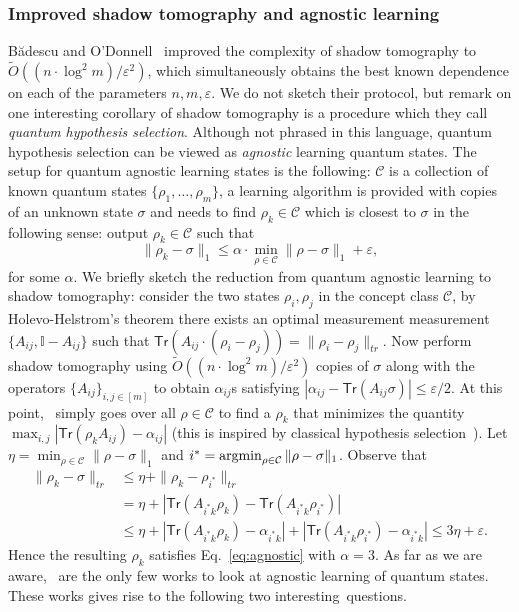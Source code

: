 \documentclass[11pt]{article}
\newcommand{\Cc}{\ensuremath{\mathcal{C}}}
\newcommand{\id}{\ensuremath{\mathbb{I}}}
\newcommand{\Tr}{\textsf{Tr}}
\begin{document}
\subsubsection{Improved shadow tomography and agnostic learning} 
 B{\u a}descu and O'Donnell~\cite{DBLP:conf/stoc/BadescuO21} improved the complexity of shadow tomography to $\tilde{O}((n\cdot \log^2 m)/\varepsilon^2)$, which simultaneously obtains the best known dependence on each of the parameters $n,m,\varepsilon$. We do not sketch their protocol, but remark on one interesting corollary of shadow tomography is a procedure which they call \emph{quantum hypothesis selection}. Although not phrased in this language, quantum hypothesis selection can be viewed as \emph{agnostic} learning quantum states. The setup for quantum agnostic learning states is the following: $\Cc$ is a collection of known quantum states $\{\rho_1,\ldots,\rho_m\}$, a learning algorithm is provided with copies of an unknown state $\sigma$ and needs to find $\rho_{k} \in \Cc$ which is closest to $\sigma$ in the following sense: output $\rho_{k}\in \Cc$ such that
 \begin{equation}
 \label{eq:agnostic}
 \|\rho_{k}-\sigma\|_1\leq \alpha \cdot \min_{\rho\in \Cc}  \|\rho-\sigma\|_1+\varepsilon,
 \end{equation}
 for some $\alpha$. We briefly sketch the reduction from quantum agnostic learning  to shadow tomography:  consider the two states $\rho_i,\rho_j$ in the concept class $\Cc$, by Holevo-Helstrom's theorem there exists an optimal measurement measurement $\{A_{ij},\id-A_{ij}\}$ such that $\Tr(A_{ij}\cdot (\rho_i-\rho_j))=\|\rho_i-\rho_j\|_{tr}$. Now perform shadow tomography using $\tilde{O}((n\cdot \log^2 m)/\varepsilon^2)$ copies of  $\sigma$ along with the operators $\{A_{ij}\}_{i,j\in [m]}$ to obtain $\alpha_{ij}$s satisfying  $|\alpha_{ij}-\Tr(A_{ij}\sigma)|\leq \varepsilon/2$. At this 
 point,~\cite{DBLP:conf/stoc/BadescuO21} simply goes over all $\rho \in \Cc$ to find a $\rho_{k}$ that minimizes the quantity $\max_{i,j}|\Tr(\rho_{k}A_{ij})-\alpha_{ij}|$ (this is inspired by  classical hypothesis selection~\cite{yatracos1985rates}). Let $\eta=\min_{\rho\in \Cc}  \|\rho-\sigma\|_1$ and $i^*=\argmin_{\rho\in \Cc}  \|\rho-\sigma\|_1$. Observe that
 \begin{align*}
\|\rho_{k}-\sigma\|_{tr}&\leq \eta+\|\rho_{k}-\rho_{i^*}\|_{tr}\\
&=\eta+|\Tr(A_{i^*k}\rho_k)-\Tr(A_{i^*k}\rho_{i^*})|\\
&\leq \eta+|\Tr(A_{i^*k}\rho_k)-\alpha_{i^*k}|+|\Tr(A_{i^*k}\rho_{i^*})-\alpha_{i^*k}|\leq 3\eta+\varepsilon.
 \end{align*}
 Hence the resulting $\rho_{k}$ satisfies Eq.~\eqref{eq:agnostic} with $\alpha=3$.   As far as we are aware,~\cite{DBLP:conf/stoc/BadescuO21,chung2018sample,fanizza2022learning,caro2021binary} are the only few works to look at agnostic learning of quantum states. 
 These works gives  rise to the following two interesting~questions.
\end{document}
